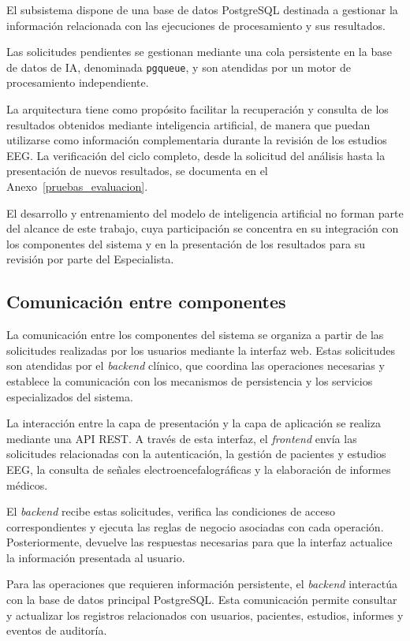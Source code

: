 El subsistema dispone de una base de datos
PostgreSQL destinada a gestionar la información
relacionada con las ejecuciones de procesamiento
y sus resultados.

Las solicitudes pendientes se gestionan mediante una cola persistente en la base de datos de IA, denominada \texttt{pgqueue}, y son atendidas por un motor de procesamiento independiente.


La arquitectura tiene como propósito facilitar la recuperación y consulta de los resultados obtenidos mediante inteligencia artificial, de manera que puedan utilizarse como información complementaria durante la revisión de los estudios EEG.  La verificación del ciclo completo, desde la solicitud del análisis hasta la presentación de nuevos resultados, se documenta en el Anexo~\ref{pruebas_evaluacion}.


El desarrollo y entrenamiento del modelo de
inteligencia artificial no forman parte del alcance
de este trabajo, cuya participación
se concentra en su integración con los componentes
del sistema y en la presentación de los resultados
para su revisión por parte del Especialista.


\subsection{Comunicación entre componentes}
\label{subsec:comunicacion-componentes}

La comunicación entre los componentes del sistema se
organiza a partir de las solicitudes realizadas por
los usuarios mediante la interfaz web. Estas solicitudes
son atendidas por el \textit{backend} clínico, que coordina
las operaciones necesarias y establece la comunicación
con los mecanismos de persistencia y los servicios
especializados del sistema.

La interacción entre la capa de presentación y la
capa de aplicación se realiza mediante una API REST.
A través de esta interfaz, el \textit{frontend} envía las
solicitudes relacionadas con la autenticación,
la gestión de pacientes y estudios EEG, la consulta
de señales electroencefalográficas y la elaboración
de informes médicos.

El \textit{backend} recibe estas solicitudes, verifica las
condiciones de acceso correspondientes y ejecuta
las reglas de negocio asociadas con cada operación.
Posteriormente, devuelve las respuestas necesarias
para que la interfaz actualice la información
presentada al usuario.

Para las operaciones que requieren información
persistente, el \textit{backend} interactúa con la base
de datos principal PostgreSQL. Esta comunicación
permite consultar y actualizar los registros
relacionados con usuarios, pacientes, estudios,
informes y eventos de auditoría.

